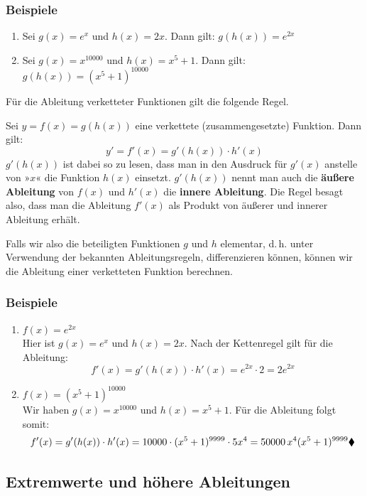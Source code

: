 \subsubsection{Beispiele}

\begin{enumerate}[label=\alph*)]
  \item Sei $g(x) = e^x$ und $h(x) = 2x$. Dann gilt: $g(h(x)) = e^{2x}$
  \item Sei $g(x) = x^{10000}$ und $h(x) = x^5 + 1$. Dann gilt: $g(h(x)) = (x^5 + 1)^{10000}$\beispielende
\end{enumerate}

Für die Ableitung verketteter Funktionen gilt die folgende Regel.


Sei $y = f(x) = g(h(x))$ eine verkettete (zusammengesetzte) Funktion. Dann gilt:
\[ y' = f'(x) = g'(h(x)) \cdot h'(x) \]
$g'(h(x))$ ist dabei so zu lesen, dass man in den Ausdruck für $g'(x)$ anstelle von »$x$« die Funktion $h(x)$ einsetzt. $g'(h(x))$ nennt man auch die \textbf{äußere Ableitung} von $f(x)$ und $h'(x)$ die \textbf{innere Ableitung}. Die Regel besagt also, dass man die Ableitung $f'(x)$ als Produkt von äußerer und innerer Ableitung erhält.

Falls wir also die beteiligten Funktionen $g$ und $h$ elementar, d.\,h. unter Verwendung der bekannten Ableitungsregeln, differenzieren können, können wir die Ableitung einer verketteten Funktion berechnen.

\subsubsection{Beispiele}

\begin{enumerate}[label=\alph*)]
  \item $f(x) = e^{2x}$\\
    Hier ist $g(x) = e^x$ und $h(x) = 2x$. Nach der Kettenregel gilt für die Ableitung:
    \[ f'(x) = g'(h(x)) \cdot h'(x) = e^{2x} \cdot 2 = 2e^{2x} \]
  \item $f(x) = (x^5 + 1)^{10000}$\\
    Wir haben $g(x) = x^{10000}$ und $h(x) = x^5 + 1$. Für die Ableitung folgt somit:
    \[ f'(x) = g'(h(x)) \cdot h'(x) = 10000 \cdot (x^5 + 1)^{9999} \cdot 5x^4 = 50000\,x^4 (x^5 + 1)^{9999}\beispielende \]
\end{enumerate}

\subsection{Extremwerte und höhere Ableitungen}

